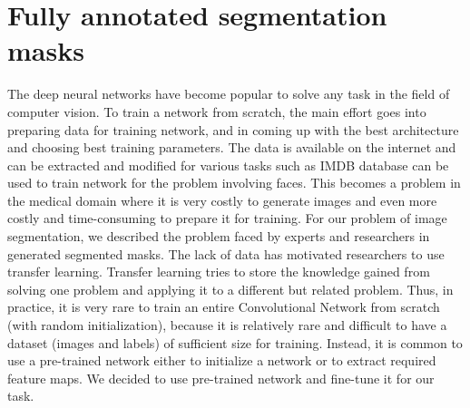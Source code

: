 %
\newpage
\chapter{Fully annotated segmentation masks}
The deep neural networks have become popular to solve any task in the field of computer vision. To train a network from scratch, the main effort goes into preparing data for training network, and in coming up with the best architecture and choosing best training parameters. The data is available on the internet and can be extracted and modified for various tasks such as IMDB database can be used to train network for the problem involving faces. This becomes a problem in the medical domain where it is very costly to generate images and even more costly and time-consuming to prepare it for training. For our problem of image segmentation, we described the problem faced by experts and researchers in generated segmented masks. The lack of data has motivated researchers to use transfer learning. Transfer learning tries to store the knowledge gained from solving one problem and applying it to a different but related problem. Thus, in practice, it is very rare to train an entire Convolutional Network from scratch (with random initialization), because it is relatively rare and difficult to have a dataset (images and labels) of sufficient size for training. Instead, it is common to use a pre-trained network either to initialize a network or to extract required feature maps. We decided to use pre-trained network and fine-tune it for our task.

